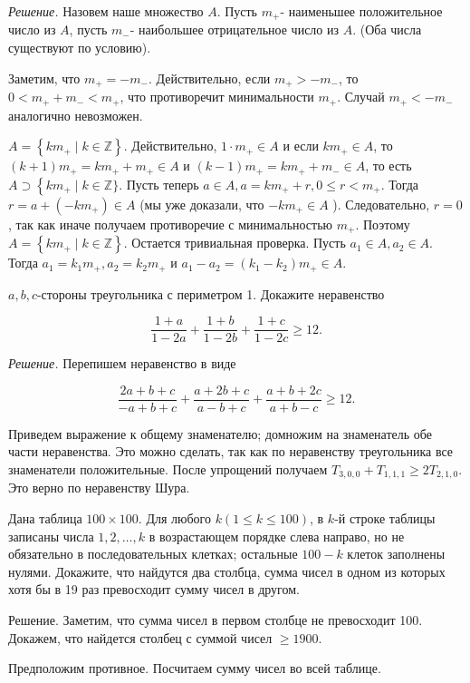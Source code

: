 \textit{Решение.} Назовем наше множество $A$. Пусть $m_{+}$- наименьшее положительное число из $A$, пусть $m_{-}$- наибольшее отрицательное число из $A$. (Оба числа существуют по условию).

Заметим, что $m_{+}=-m_{-}$. Действительно, если $m_{+}>-m_{-}$, то $0<m_{+}+m_{-}<m_{+}$, что противоречит минимальности $m_{+}$. Случай $m_{+}<-m_{-}$аналогично невозможен.

$A=\left\{k m_{+} \mid k \in \mathbb{Z}\right\}$. Действительно, $1 \cdot m_{+} \in A$ и если $k m_{+} \in A$, то $(k+1) m_{+}=k m_{+}+m_{+} \in A$ и $(k-1) m_{+}=k m_{+}+m_{-} \in A$, то есть $A \supset\left\{k m_{+} \mid k \in\right. \mathbb{Z}\}$. Пусть теперь $a \in A, a=k m_{+}+r, 0 \leqslant r<m_{+}$. Тогда $r=a+\left(-k m_{+}\right) \in A$ (мы уже доказали, что $-k m_{+} \in A$ ). Следовательно, $r=0$, так как иначе получаем противоречие с минимальностью $m_{+}$. Поэтому $A=\left\{k m_{+} \mid k \in \mathbb{Z}\right\}$.
Остается тривиальная проверка. Пусть $a_1 \in A, a_2 \in A$. Тогда $a_1=k_1 m_{+}, a_2=k_2 m_{+}$ и $a_1-a_2=\left(k_1-k_2\right) m_{+} \in A$.


$a, b, c$-стороны треугольника с периметром 1. Докажите неравенство

$$
\frac{1+a}{1-2 a}+\frac{1+b}{1-2 b}+\frac{1+c}{1-2 c} \geqslant 12 .
$$

\textit{Решение.} Перепишем неравенство в виде

$$
\frac{2 a+b+c}{-a+b+c}+\frac{a+2 b+c}{a-b+c}+\frac{a+b+2 c}{a+b-c} \geqslant 12 .
$$


Приведем выражение к общему знаменателю; домножим на знаменатель обе части неравенства. Это можно сделать, так как по неравенству треугольника все знаменатели положительные. После упрощений получаем $T_{3,0,0}+T_{1,1,1} \geqslant 2 T_{2,1,0}$. Это верно по неравенству Шура.
 
Дана таблица $100 \times 100$. Для любого $k(1 \leqslant k \leqslant 100)$, в $k$-й строке таблицы записаны числа $1,2, \ldots, k$ в возрастающем порядке слева направо, но не обязательно в последовательных клетках; остальные $100-k$ клеток заполнены нулями. Докажите, что найдутся два столбца, сумма чисел в одном из которых хотя бы в 19 раз превосходит сумму чисел в другом.

Решение. Заметим, что сумма чисел в первом столбце не превосходит 100. Докажем, что найдется столбец с суммой чисел $\geqslant 1900$.

Предположим противное.
Посчитаем сумму чисел во всей таблице.

